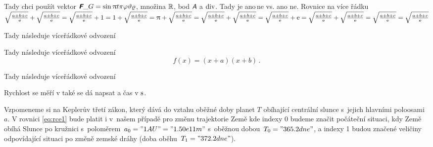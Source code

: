 \documentclass[twoside,fykos]{fksserie}
\begin{document}
\maketitle

%

\problemsheading %


\solutionheading %


Tady chci použít vektor\cite{lamport94} $\vect{F}\_G = \sin \pi t \oldpi \phi \theta \rho$, množina $\mathbb{R}$, bod $\bod{A}$ a $\mathrm{div}$.
Tady je ano\,ne vs. ano ne. Rovnice {na více} řádku
$
\sqrt{\frac{a+b+c}{\mathrm{e}}} + \sqrt{\frac{a+b+c}{\mathrm{e}}} =
\sqrt{\frac{a+b+c}{\mathrm{e}}} + 1 =
1 + \sqrt{\frac{a+b+c}{\mathrm{e}}} =
\uppi + \sqrt{\frac{a+b+c}{\mathrm{e}}} =
\sqrt{\frac{a+b+c}{\mathrm{e}}} + \sqrt{\frac{a+b+c}{\mathrm{e}}} =
\sqrt{\frac{a+b+c}{\mathrm{e}}} + \mathrm{e} =
\sqrt{\frac{a+b+c}{\mathrm{e}}} + \sqrt{\frac{a+b+c}{\mathrm{e}}} =
\sqrt{\frac{a+b+c}{\mathrm{e}}} = \sqrt{\frac{a+b+c}{\mathrm{e}}}
$

Tady následuje víceřádkové odvození\cite{lamport94,lamport95}

Tady následuje víceřádkové odvození
\[
 f(x) = (x+a)(x+b)\,. \label{eq:rce2}
\]

Tady následuje víceřádkové odvození

Rychlost se měří v  také se dá napsat  a čas v $\jd{s}$.




Vzpomeneme si na Keplerův třetí zákon, který dává do vztahu oběžné 
doby planet $T$ obíhající centrální slunce s~jejich hlavními 
poloosami $a$. V rovnici \eqref{eq:rce1} bude platit i v~našem případě pro změnu
trajektorie Země
kde indexy 0 budeme značit počáteční situaci, kdy Země obíhá Slunce
po kružnici s~poloměrem~$a_0 = "1 AU" = "1.50e11 m"$ s~oběžnou dobou~$T_0 =
"365.2 dne"$,
a indexy 1 budou značené veličiny odpovídající 
situaci po změně zemské dráhy (doba oběhu~$T_1 = "372.2 dne"$).
\end{document}
